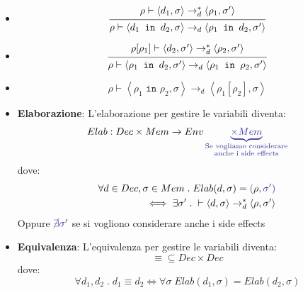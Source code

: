 \documentclass[a4paper]{article}
\begin{document}
\begin{itemize}
  \item
    \[
      \begin{prooftree}
        \hypo{ 
          \rho \vdash \left< d_1, \sigma \right> \to^*_d \left< \rho_1, \sigma' \right>
        }
        \infer1{ 
          \rho \vdash \left< d_1 \texttt{ in } d_2, \sigma \right> \to_d
          \left< \rho_1 \texttt{ in } d_2, \sigma' \right>
        }
      \end{prooftree}
    \] 

  \item 
    \[
      \begin{prooftree}
        \hypo{ 
          \rho[\rho_1] \vdash \left< d_2, \sigma' \right> \to^*_d \left< \rho_2,
          \sigma' \right>
        }
        \infer1{ 
          \rho \vdash \left< \rho_1 \texttt{ in } d_2, \sigma' \right> \to_d
          \left< \rho_1 \texttt{ in } \rho_2, \sigma' \right>
        }
      \end{prooftree}
    \] 

  \item 
    \[
      \rho \vdash \left< \rho_1 \texttt{ in } \rho_2, \sigma \right> \to_d
      \left< \rho_1[\rho_2], \sigma \right>
    \] 
\end{itemize}

\vspace{1em}
\noindent
\begin{itemize}
  \item \textbf{Elaborazione}:
    L'elaborazione per gestire le variabili diventa:
    \[
      Elab: Dec \times Mem \to Env \mathcolor{Blue}{\underbrace{\times Mem}_{\substack{
            \text{Se vogliamo considerare}\\
            \text{anche i side effects}
          }
        }
      }
    \] 
    dove:
    \[
      \begin{aligned}
        \forall d \in Dec, \sigma \in Mem \;.\; Elab(d, \sigma) = \mathcolor{Blue}{(}\rho
        \mathcolor{Blue}{, \sigma')} \\
        \iff \exists \sigma' \;.\;
        \vdash \left< d, \sigma \right> \to^*_d \left< \rho, \sigma' \right>
      \end{aligned}
    \] 
    Oppure \( \mathcolor{Blue}{\cancel \exists \sigma'} \) se si vogliono considerare
    anche i side effects

  \item \textbf{Equivalenza}:
    L'equivalenza per gestire le variabili diventa:
    \[
      \equiv \subseteq Dec \times Dec
    \] 
    dove:
    \[
      \forall d_1, d_2 \;.\; d_1 \equiv d_2 \iff
      \forall \sigma \; Elab(d_1, \sigma) = Elab(d_2, \sigma)
    \] 
\end{itemize}
\end{document}
